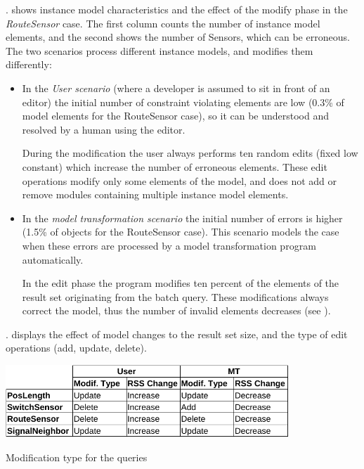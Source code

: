 . shows instance model characteristics and the effect of the modify phase in the \emph{RouteSensor} case. The first column counts the number of instance model elements, and the second shows the number of Sensors, which can be erroneous. The two scenarios process different instance models, and modifies them differently:

\begin{itemize}
\item 
In the \emph{User scenario} (where a developer is assumed to sit in front of an editor) the initial number of constraint violating elements are low (0.3\% of model elements for the RouteSensor case), so it can be understood and resolved by a human using the editor.

During the modification the user always performs ten random edits (fixed low constant) which increase the number of erroneous elements. These edit operations modify only some elements of the model, and does not add or remove modules containing multiple instance model elements.

\item 
In the \emph{model transformation scenario} the initial number of errors is higher (1.5\% of objects for the RouteSensor case). This scenario models the case when these errors are processed by a model transformation program automatically.

In the edit phase the program modifies ten percent of the elements of the result set originating from the batch query. These modifications always correct the model, thus the number of invalid elements decreases (see ).

\end{itemize}


. displays the effect of model changes to the result set size, and the type of edit operations (add, update, delete).

\begin{table}[h]
\centering
\includegraphics[width=0.8\textwidth]{figures/instance/modify_type-crop.pdf}
\caption{Modification type for the queries}
\label{table:modify_type}
\end{table}




